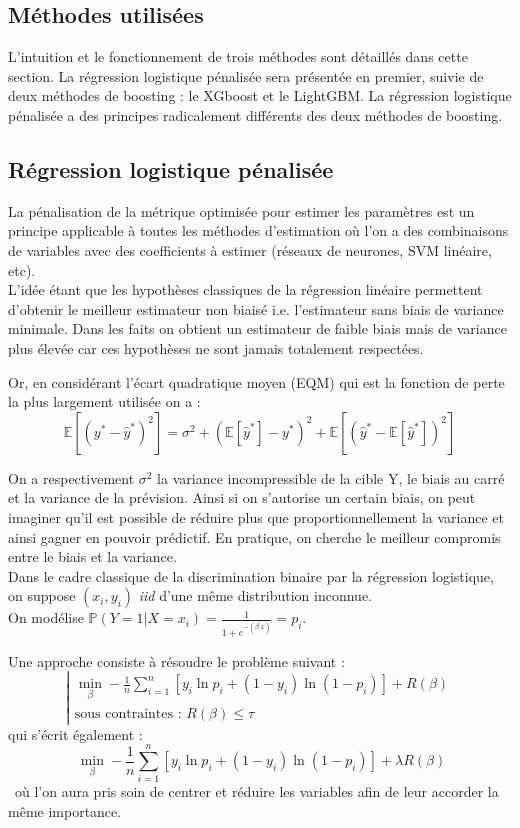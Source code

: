 \documentclass[french]{article}
\begin{document}
\begin{multicols}{2}
\section{Méthodes utilisées}
L'intuition et le fonctionnement de trois méthodes sont détaillés dans cette section. La régression logistique pénalisée sera présentée en premier, suivie de deux méthodes de boosting : le XGboost et le LightGBM. La régression logistique pénalisée a des principes radicalement différents des deux méthodes de boosting.


\subsection{Régression logistique pénalisée}
La pénalisation de la métrique optimisée pour estimer les paramètres est un principe applicable à toutes les méthodes d'estimation où l’on a des combinaisons de variables avec des coefficients à estimer (réseaux de neurones, SVM linéaire, etc).\\
L'idée étant que les hypothèses classiques de la régression linéaire permettent d'obtenir le meilleur estimateur non biaisé i.e. l'estimateur sans biais de variance minimale. Dans les faits on obtient un estimateur de faible biais mais de variance plus élevée car ces hypothèses ne sont jamais totalement respectées.

Or, en considérant l'écart quadratique moyen (EQM) qui est la fonction de perte la plus largement utilisée on a : 
\[\mathbb{E}\left[\left(y^{*}-\hat{y}^{*}\right)^{2}\right]=\sigma^{2}+\left(\mathbb{E}\left[\hat{y}^{*}\right]-y^{*}\right)^{2}+\mathbb{E}\left[\left(\hat{y}^{*}-\mathbb{E}\left[\hat{y}^{*}\right]\right)^{2}\right] \]

On a respectivement $\sigma^{2}$ la variance incompressible de la cible Y, le biais au carré et la variance de la prévision. Ainsi si on s'autorise un certain biais, on peut imaginer qu'il est possible de réduire plus que proportionnellement la variance et ainsi gagner en pouvoir prédictif.
En pratique, on cherche le meilleur compromis entre le biais et la variance.\\
Dans le cadre classique de la discrimination binaire par la régression logistique, on suppose $(x_i,y_i)$ \emph{iid} d'une même distribution inconnue.\\
On modélise $\mathbb{P}(Y=1|X=x_i)=\frac{1}{1+e^{-\left(\beta^{\prime} x\right)}}=p_i$.

\noindent Une approche \cite{art3} consiste à résoudre le problème suivant : 
\[ \left| \begin{array}{l}\displaystyle\min_{\beta}-\frac{1}{n} \sum_{i=1}^{n} \left[y_{i} \ln p_{i}+\left(1-y_{i}\right) \ln \left(1-p_{i}\right)\right] + R(\beta) \\
\text{sous contraintes : } R (\beta) \leq \tau \end{array} \right.\]
qui s'écrit également : 
\[\ \displaystyle\min_{\beta}-\frac{1}{n} \sum_{i=1}^{n} \left[y_{i} \ln p_{i}+\left(1-y_{i}\right) \ln \left(1-p_{i}\right)\right] +\lambda R(\beta) \]\
où l'on aura pris soin de centrer et réduire les variables afin de leur accorder la même importance.
\\


\end{multicols}
\end{document}

